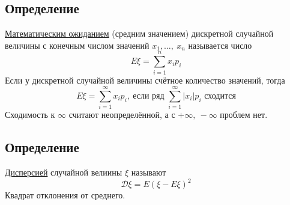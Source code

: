 \documentclass[12pt, a4paper]{article}
\begin{document}
    \subsection*{Определение}
    \underline{Математическим ожиданием} (средним значением) дискретной случайной величины с конечным числом значений $x_1,\dots,\ x_n$ называется число
    \[E\xi = \sum_{i = 1}^{n} x_i p_i\]
    Если у дискретной случайной величины счётное количество значений, тогда
    \[E\xi = \sum_{i = 1}^{\infty} x_i p_i,\ \text{если ряд $\displaystyle\sum_{i = 1}^{\infty} |x_i|p_i$ сходится}\]
    Сходимость к $\infty$ считают неопределённой, а с $+\infty,\ -\infty$ проблем нет.
    \subsection*{Определение}
    \underline{Дисперсией} случайной велиины $\xi$ называют
    \[\mathcal{D}\xi = E(\xi - E\xi)^2\]
    Квадрат отклонения от среднего.
\end{document}
